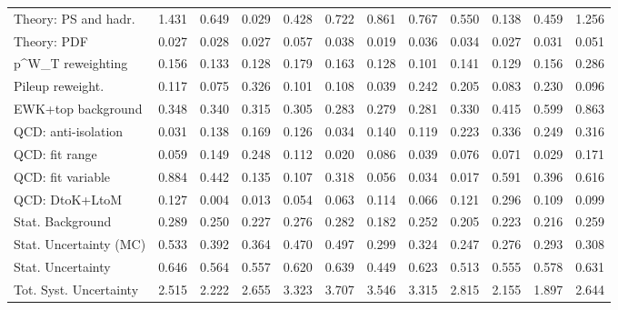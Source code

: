 \begin{tabular}{l|p{0.6cm}p{0.6cm}p{0.6cm}p{0.6cm}p{0.6cm}p{0.6cm}p{0.6cm}p{0.6cm}p{0.6cm}p{0.6cm}p{0.6cm}}
Theory: PS and hadr.                     & 1.431 & 0.649 & 0.029 & 0.428 & 0.722 & 0.861 & 0.767 & 0.550 & 0.138 & 0.459 & 1.256 \\
Theory: PDF                              & 0.027 & 0.028 & 0.027 & 0.057 & 0.038 & 0.019 & 0.036 & 0.034 & 0.027 & 0.031 & 0.051 \\
p^{W}_{T} reweighting                    & 0.156 & 0.133 & 0.128 & 0.179 & 0.163 & 0.128 & 0.101 & 0.141 & 0.129 & 0.156 & 0.286 \\
Pileup reweight.                         & 0.117 & 0.075 & 0.326 & 0.101 & 0.108 & 0.039 & 0.242 & 0.205 & 0.083 & 0.230 & 0.096 \\
EWK+top background                       & 0.348 & 0.340 & 0.315 & 0.305 & 0.283 & 0.279 & 0.281 & 0.330 & 0.415 & 0.599 & 0.863 \\
QCD: anti-isolation                      & 0.031 & 0.138 & 0.169 & 0.126 & 0.034 & 0.140 & 0.119 & 0.223 & 0.336 & 0.249 & 0.316 \\
QCD: fit range                           & 0.059 & 0.149 & 0.248 & 0.112 & 0.020 & 0.086 & 0.039 & 0.076 & 0.071 & 0.029 & 0.171 \\
QCD: fit variable                        & 0.884 & 0.442 & 0.135 & 0.107 & 0.318 & 0.056 & 0.034 & 0.017 & 0.591 & 0.396 & 0.616 \\
QCD: DtoK+LtoM                           & 0.127 & 0.004 & 0.013 & 0.054 & 0.063 & 0.114 & 0.066 & 0.121 & 0.296 & 0.109 & 0.099 \\
Stat. Background                         & 0.289 & 0.250 & 0.227 & 0.276 & 0.282 & 0.182 & 0.252 & 0.205 & 0.223 & 0.216 & 0.259 \\
Stat. Uncertainty (MC)                   & 0.533 & 0.392 & 0.364 & 0.470 & 0.497 & 0.299 & 0.324 & 0.247 & 0.276 & 0.293 & 0.308 \\
\hline
Stat. Uncertainty                        & 0.646 & 0.564 & 0.557 & 0.620 & 0.639 & 0.449 & 0.623 & 0.513 & 0.555 & 0.578 & 0.631 \\
\hline
Tot. Syst. Uncertainty                   & 2.515 & 2.222 & 2.655 & 3.323 & 3.707 & 3.546 & 3.315 & 2.815 & 2.155 & 1.897 & 2.644 \\
\hline
\end{tabular}
